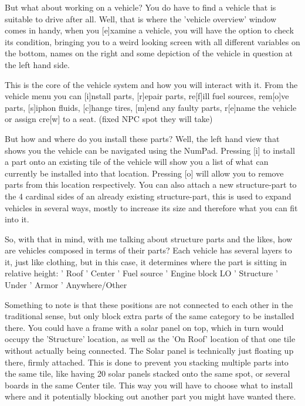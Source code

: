 \documentclass[11pt]{report}
\begin{document}
But what about working on a vehicle? You do have to find a vehicle that is suitable to drive after all. Well, that is where the 'vehicle overview' window comes in handy, when you [e]xamine a vehicle, you will have the option to check its condition, bringing you to a weird looking screen with all different variables on the bottom, names on the right and some depiction of the vehicle in question at the left hand side.

This is the core of the vehicle system and how you will interact with it.
From the vehicle menu you can [i]nstall parts, [r]epair parts, re[f]ill fuel sources, rem[o]ve parts, [s]iphon fluids, [c]hange tires, [m]end any faulty parts, r[e]name the vehicle or assign cre[w] to a seat. (fixed NPC spot they will take)

But how and where do you install these parts? Well, the left hand view that shows you the vehicle can be navigated using the NumPad. Pressing [i] to install a part onto an existing tile of the vehicle will show you a list of what can currently be installed into that location. Pressing [o] will allow you to remove parts from this location respectively. You can also attach a new structure-part to the 4 cardinal sides of an already existing structure-part, this is used to expand vehicles in several ways, mostly to increase its size and therefore what you can fit into it.

So, with that in mind, with me talking about structure parts and the likes, how are vehicles composed in terms of their parts? Each vehicle has several layers to it, just like clothing, but in this case, it determines where the part is sitting in relative height:
    ' Roof
    ' Center
    ' Fuel source
    ' Engine block LO
    ' Structure
    ' Under
    ' Armor
    ' Anywhere/Other

Something to note is that these positions are not connected to each other in the traditional sense, but only block extra parts of the same category to be installed there. You could have a frame with a solar panel on top, which in turn would occupy the 'Structure' location, as well as the 'On Roof' location of that one tile without actually being connected. The Solar panel is technically just floating up there, firmly attached. This is done to prevent you stacking multiple parts into the same tile, like having 20 solar panels stacked onto the same spot, or several boards in the same Center tile. This way you will have to choose what to install where and it potentially blocking out another part you might have wanted there.
\end{document}
